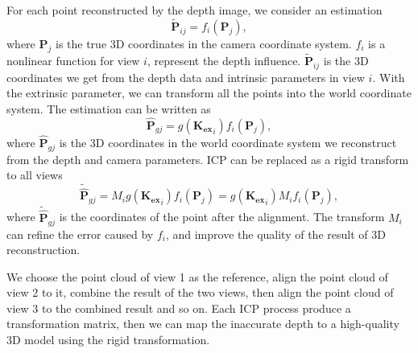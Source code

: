 For each point reconstructed by the depth image, we consider an estimation
\begin{equation}
\mathbf{\tilde{P}}_{ij}=f_{i}(\mathbf{P}_{j}),
\end{equation}
where $\mathbf{P}_{j}$ is the true 3D coordinates in the camera coordinate system. $f_{i}$ is a nonlinear function for view $i$, represent the depth influence. $\mathbf{\tilde{P}}_{ij}$ is the 3D coordinates we get from the depth data and intrinsic parameters in view $i$. With the extrinsic parameter, we can transform all the points into the world coordinate system. The estimation can be written as
\begin{equation}
\mathbf{\hat{P}}_{gj}=g(\mathbf{K_{ex}}_{i})f_{i}(\mathbf{P}_{j}),
\end{equation}
where $\mathbf{\hat{P}}_{gj}$ is the 3D coordinates in the world coordinate system we reconstruct from the depth and camera parameters. ICP can be replaced as a rigid transform to all views
\begin{equation}
\mathbf{\tilde{\hat{P}}}_{gj}=M_{i}g(\mathbf{K_{ex}}_{i})f_{i}(\mathbf{P}_{j})=g(\mathbf{K_{ex}}_{i})M_{i}f_{i}(\mathbf{P}_{j}),
\end{equation}
where $\mathbf{\tilde{\hat{P}}}_{gj}$ is the coordinates of the point after the alignment. The transform $M_{i}$ can refine the error caused by $f_{i}$, and improve the quality of the result of 3D reconstruction.

We choose the point cloud of view 1 as the reference, align the point cloud of view 2 to it, combine the result of the two views, then align the point cloud of view 3 to the combined result and so on. Each ICP process produce a transformation matrix, then we can map the inaccurate depth to a high-quality 3D model using the rigid transformation.




 